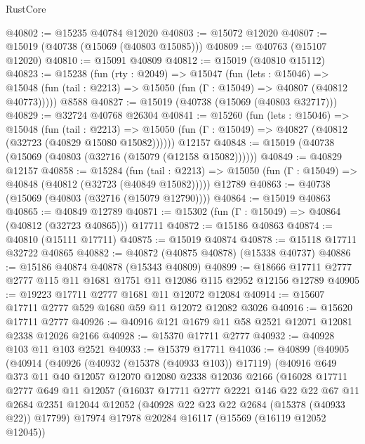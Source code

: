 \begin{lexlean}{RustCore}
\begin{coremodule}
@40802 := @15235 @40784 @12020
@40803 := @15072 @12020
@40807 := @15019 (@40738 (@15069 (@40803 @15085)))
@40809 := @40763 (@15107 @12020)
@40810 := @15091 @40809
@40812 := @15019 (@40810 @15112)
@40823 := @15238
    (fun (rty : @2049) =>
    @15047
      (fun (lets : @15046) =>
      @15048 (fun (tail : @2213) => @15050 (fun (Γ : @15049) => @40807 (@40812 @40773)))))
    @8588
@40827 := @15019 (@40738 (@15069 (@40803 @32717)))
@40829 := @32724 @40768 @26304
@40841 := @15260
    (fun (lets : @15046) =>
    @15048
      (fun (tail : @2213) =>
      @15050 (fun (Γ : @15049) => @40827 (@40812 (@32723 (@40829 @15080 @15082))))))
    @12157
@40848 := @15019 (@40738 (@15069 (@40803 (@32716 (@15079 (@12158 @15082))))))
@40849 := @40829 @12157
@40858 := @15284
    (fun (tail : @2213) => @15050 (fun (Γ : @15049) => @40848 (@40812 (@32723 (@40849 @15082)))))
    @12789
@40863 := @40738 (@15069 (@40803 (@32716 (@15079 @12790))))
@40864 := @15019 @40863
@40865 := @40849 @12789
@40871 := @15302 (fun (Γ : @15049) => @40864 (@40812 (@32723 @40865))) @17711
@40872 := @15186 @40863
@40874 := @40810 (@15111 @17711)
@40875 := @15019 @40874
@40878 := @15118 @17711 @32722 @40865
@40882 := @40872 (@40875 @40878) (@15338 @40737)
@40886 := @15186 @40874 @40878 (@15343 @40809)
@40899 := @18666 @17711 @2777 @2777 @115 @11 @1681 @1751 @11 @12086 @115 @2952 @12156 @12789
@40905 := @19223 @17711 @2777 @1681 @11 @12072 @12084
@40914 := @15607 @17711 @2777 @529 @1680 @59 @11 @12072 @12082 @3026
@40916 := @15620 @17711 @2777
@40926 := @40916 @121 @1679 @11 @58 @2521 @12071 @12081 @2338 @12026 @2166
@40928 := @15370 @17711 @2777
@40932 := @40928 @103 @11 @103 @2521
@40933 := @15379 @17711
@41036 := @40899
    (@40905
      (@40914
        (@40926
          (@40932 (@15378 (@40933 @103)) @17119)
          (@40916
            @649
            @373
            @11
            @40
            @12057
            @12070
            @12080
            @2338
            @12036
            @2166
            (@16028
              @17711
              @2777
              @649
              @11
              @12057
              (@16037
                @17711
                @2777
                @2221
                @146
                @22
                @22
                @67
                @11
                @2684
                @2351
                @12044
                @12052
                (@40928 @22 @23 @22 @2684 (@15378 (@40933 @22)) @17799)
                @17974
                @17978
                @20284
                @16117
                (@15569 (@16119 @12052 @12045))

\end{coremodule}
\end{lexlean}

